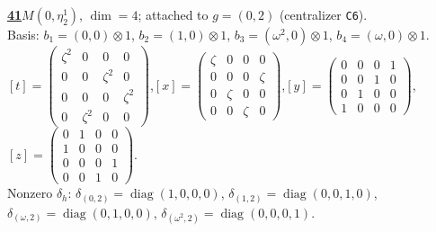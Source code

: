 \begin{samepage}\noindent\textbf{\underline{41}}\quad $M(0,\eta^{1}_{2})$, $\dim=4$; attached to $g=(0,2)$ (centralizer \texttt{C6}).\\
Basis: $b_{1}=(0,0)\otimes 1$, $b_{2}=(1,0)\otimes 1$, $b_{3}=(\omega^2,0)\otimes 1$, $b_{4}=(\omega,0)\otimes 1$.\\
$[t]=\left(\begin{smallmatrix} \zeta^2 & 0 & 0 & 0 \\ 0 & 0 & \zeta^2 & 0 \\ 0 & 0 & 0 & \zeta^2 \\ 0 & \zeta^2 & 0 & 0 \end{smallmatrix}\right)$,\quad $[x]=\left(\begin{smallmatrix} \zeta & 0 & 0 & 0 \\ 0 & 0 & 0 & \zeta \\ 0 & \zeta & 0 & 0 \\ 0 & 0 & \zeta & 0 \end{smallmatrix}\right)$,\quad $[y]=\left(\begin{smallmatrix} 0 & 0 & 0 & 1 \\ 0 & 0 & 1 & 0 \\ 0 & 1 & 0 & 0 \\ 1 & 0 & 0 & 0 \end{smallmatrix}\right)$,\quad $[z]=\left(\begin{smallmatrix} 0 & 1 & 0 & 0 \\ 1 & 0 & 0 & 0 \\ 0 & 0 & 0 & 1 \\ 0 & 0 & 1 & 0 \end{smallmatrix}\right)$.\\
Nonzero $\delta_h$: $\delta_{(0,2)}=\operatorname{diag}(1,0,0,0)$, $\delta_{(1,2)}=\operatorname{diag}(0,0,1,0)$, $\delta_{(\omega,2)}=\operatorname{diag}(0,1,0,0)$, $\delta_{(\omega^2,2)}=\operatorname{diag}(0,0,0,1)$.\end{samepage}
\medskip

